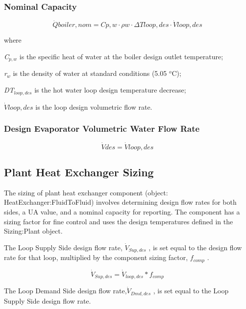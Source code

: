 \subsubsection{Nominal Capacity}\label{nominal-capacity}

\begin{equation}
\dot Qboiler,nom = Cp,w\cdot \rho w\cdot \Delta Tloop,des\cdot \dot Vloop,des
\end{equation}

where

\emph{C\(_{p,w}\)} is the specific heat of water at the boiler design outlet temperature;

\emph{r\(_{w}\)} is the density of water at standard conditions (5.05 \(^{o}\)C);

\emph{DT\(_{loop,des}\)} is the hot water loop design temperature decrease;

\(\dot Vloop,des\) is the loop design volumetric flow rate.

\subsubsection{Design Evaporator Volumetric Water Flow Rate}\label{design-evaporator-volumetric-water-flow-rate-1}

\begin{equation}
\dot Vdes = \dot Vloop,des
\end{equation}

\subsection{Plant Heat Exchanger Sizing}\label{plant-heat-exchanger-sizing}

The sizing of plant heat exchanger component (object: HeatExchanger:FluidToFluid) involves determining design flow rates for both sides, a UA value, and a nominal capacity for reporting. The component has a sizing factor for fine control and uses the design temperatures defined in the Sizing:Plant object.

The Loop Supply Side design flow rate, \({\dot V_{Sup,des}}\) , is set equal to the design flow rate for that loop, multiplied by the component sizing factor, \({f_{comp}}\) .

\begin{equation}
{\dot V_{Sup,des}} = {\dot V_{loop,des}}*{f_{comp}}
\end{equation}

The Loop Demand Side design flow rate,\({\dot V_{Dmd,des}}\) , is set equal to the Loop Supply Side design flow rate.

